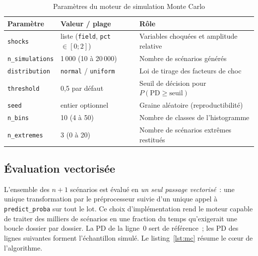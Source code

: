 \documentclass[a4paper,12pt,oneside]{report}
\begin{document}
\begin{table}[H]
\centering
\caption{Paramètres du moteur de simulation Monte Carlo}
\label{tab:mc_params}
\renewcommand{\arraystretch}{1.3}
\begin{tabularx}{\textwidth}{@{}l l Y@{}}
\toprule
\textbf{Paramètre} & \textbf{Valeur / plage} & \textbf{Rôle} \\
\midrule
\texttt{shocks}        & liste (\texttt{field}, \texttt{pct}$\in[0;2]$) & Variables choquées et amplitude relative \\
\texttt{n\_simulations}& 1\,000 (10 à 20\,000)          & Nombre de scénarios générés \\
\texttt{distribution}  & \texttt{normal} / \texttt{uniform} & Loi de tirage des facteurs de choc \\
\texttt{threshold}     & 0{,}5 par défaut               & Seuil de décision pour $P(\text{PD}\geq\text{seuil})$ \\
\texttt{seed}          & entier optionnel              & Graine aléatoire (reproductibilité) \\
\texttt{n\_bins}       & 10 (4 à 50)                   & Nombre de classes de l'histogramme \\
\texttt{n\_extremes}   & 3 (0 à 20)                    & Nombre de scénarios extrêmes restitués \\
\bottomrule
\end{tabularx}
\end{table}

\subsection{Évaluation vectorisée}

L'ensemble des $n+1$ scénarios est évalué en \emph{un seul passage vectorisé}~: une unique
transformation par le préprocesseur suivie d'un unique appel à \texttt{predict\_proba} sur tout
le lot. Ce choix d'implémentation rend le moteur capable de traiter des milliers de scénarios
en une fraction du temps qu'exigerait une boucle dossier par dossier. La PD de la ligne~0 sert
de référence~; les PD des lignes suivantes forment l'échantillon simulé. Le listing~\ref{lst:mc}
résume le c\oe ur de l'algorithme.
\end{document}
